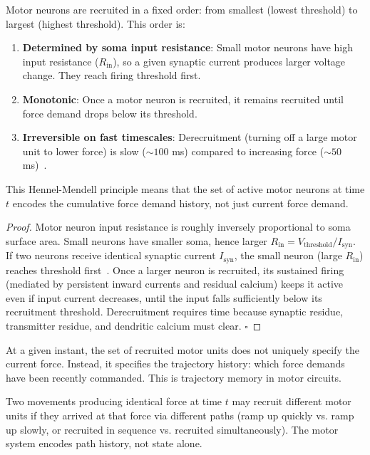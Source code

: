 \begin{theorem}
\label{thm:size-principle}
Motor neurons are recruited in a fixed order: from smallest (lowest threshold) to largest (highest threshold). This order is:
\begin{enumerate}[label=(\roman*), noitemsep]
\item \textbf{Determined by soma input resistance}: Small motor neurons have high input resistance ($R_{\text{in}}$), so a given synaptic current produces larger voltage change. They reach firing threshold first.
\item \textbf{Monotonic}: Once a motor neuron is recruited, it remains recruited until force demand drops below its threshold.
\item \textbf{Irreversible on fast timescales}: Derecruitment (turning off a large motor unit to lower force) is slow ($\sim 100$ ms) compared to increasing force ($\sim 50$ ms)~\cite{CayeMorris2004}.
\end{enumerate}

This Hennel-Mendell principle means that the set of active motor neurons at time $t$ encodes the cumulative force demand history, not just current force demand.
\end{theorem}

\begin{proof}
Motor neuron input resistance is roughly inversely proportional to soma surface area. Small neurons have smaller soma, hence larger $R_{\text{in}} = V_{\text{threshold}} / I_{\text{syn}}$. If two neurons receive identical synaptic current $I_{\text{syn}}$, the small neuron (large $R_{\text{in}}$) reaches threshold first~\cite{HennelMendell1981}. Once a larger neuron is recruited, its sustained firing (mediated by persistent inward currents and residual calcium) keeps it active even if input current decreases, until the input falls sufficiently below its recruitment threshold. Derecruitment requires time because synaptic residue, transmitter residue, and dendritic calcium must clear. $\square$
\end{proof}

\begin{corollary}
\label{cor:activation-encodes-trajectory}
At a given instant, the set of recruited motor units does not uniquely specify the current force. Instead, it specifies the trajectory history: which force demands have been recently commanded. This is trajectory memory in motor circuits.

Two movements producing identical force at time $t$ may recruit different motor units if they arrived at that force via different paths (ramp up quickly vs. ramp up slowly, or recruited in sequence vs. recruited simultaneously). The motor system encodes path history, not state alone.
\end{corollary}

